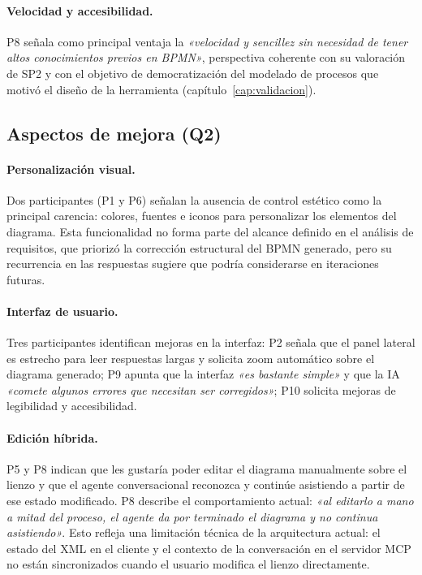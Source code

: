 \paragraph{Velocidad y accesibilidad.} P8 señala como principal ventaja la \textit{«velocidad y sencillez sin necesidad de tener altos conocimientos previos en BPMN»}, perspectiva coherente con su valoración de SP2 y con el objetivo de democratización del modelado de procesos que motivó el diseño de la herramienta (capítulo~\ref{cap:validacion}).

\subsection{Aspectos de mejora (Q2)}\label{subsec:q2}

\paragraph{Personalización visual.} Dos participantes (P1 y P6) señalan la ausencia de control estético como la principal carencia: colores, fuentes e iconos para personalizar los elementos del diagrama. Esta funcionalidad no forma parte del alcance definido en el análisis de requisitos, que priorizó la corrección estructural del BPMN generado, pero su recurrencia en las respuestas sugiere que podría considerarse en iteraciones futuras.

\paragraph{Interfaz de usuario.} Tres participantes identifican mejoras en la interfaz: P2 señala que el panel lateral es estrecho para leer respuestas largas y solicita zoom automático sobre el diagrama generado; P9 apunta que la interfaz \textit{«es bastante simple»} y que la IA \textit{«comete algunos errores que necesitan ser corregidos»}; P10 solicita mejoras de legibilidad y accesibilidad.

\paragraph{Edición híbrida.} P5 y P8 indican que les gustaría poder editar el diagrama manualmente sobre el lienzo y que el agente conversacional reconozca y continúe asistiendo a partir de ese estado modificado. P8 describe el comportamiento actual: \textit{«al editarlo a mano a mitad del proceso, el agente da por terminado el diagrama y no continua asistiendo»}. Esto refleja una limitación técnica de la arquitectura actual: el estado del XML en el cliente y el contexto de la conversación en el servidor MCP no están sincronizados cuando el usuario modifica el lienzo directamente.

